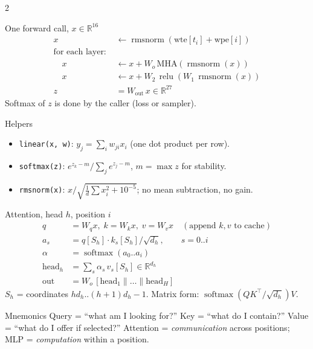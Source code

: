 \documentclass[10pt,letterpaper]{article}
\newcommand{\code}[1]{\lstinline[basicstyle=\ttfamily\small]|#1|}
\newcommand{\R}{\mathbb{R}}
\newcommand{\softmax}{\operatorname{softmax}}
\newcommand{\rmsnorm}{\operatorname{rmsnorm}}
\newcommand{\relu}{\operatorname{relu}}
\newcounter{q}
\begin{document}
\begin{multicols}{2}
\begin{cs}{One forward call, $x\in\R^{16}$}
\begin{align*}
x &\leftarrow \rmsnorm(\mathrm{wte}[t_i] + \mathrm{wpe}[i]) \\
\text{for each layer: } & \\
\quad x &\leftarrow x + W_o\,\mathrm{MHA}(\rmsnorm(x)) \\
\quad x &\leftarrow x + W_2\,\relu(W_1\,\rmsnorm(x)) \\
z &= W_{\text{out}}\,x \in\R^{27}
\end{align*}
Softmax of $z$ is done by the caller (loss or sampler).
\end{cs}

\begin{cs}{Helpers}
\begin{itemize}
  \item \code{linear(x, w)}: $y_j = \sum_i w_{ji}x_i$ (one dot product per row).
  \item \code{softmax(z)}: $e^{z_k-m}/\sum_j e^{z_j-m}$, $m=\max z$ for stability.
  \item \code{rmsnorm(x)}: $x/\sqrt{\frac1d\sum x_i^2 + 10^{-5}}$; no mean subtraction, no gain.
\end{itemize}
\end{cs}

\begin{cs}{Attention, head $h$, position $i$}
\begin{align*}
q &= W_q x,\; k = W_k x,\; v = W_v x \quad(\text{append }k,v\text{ to cache})\\
a_{s} &= q[S_h]\cdot k_s[S_h]/\sqrt{d_h}, \qquad s = 0..i \\
\alpha &= \softmax(a_0..a_i) \\
\mathrm{head}_h &= \textstyle\sum_s \alpha_s\, v_s[S_h] \in\R^{d_h} \\
\text{out} &= W_o\,[\mathrm{head}_1\|\dots\|\mathrm{head}_H]
\end{align*}
$S_h$ = coordinates $hd_h..(h{+}1)d_h{-}1$. Matrix form: $\softmax(QK^\top/\sqrt{d_h})V$.
\end{cs}

\begin{cs}{Mnemonics}
Query = ``what am I looking for?'' Key = ``what do I contain?'' Value = ``what do I offer if selected?'' Attention = \emph{communication} across positions; MLP = \emph{computation} within a position.
\end{cs}


\end{multicols}
\end{document}
